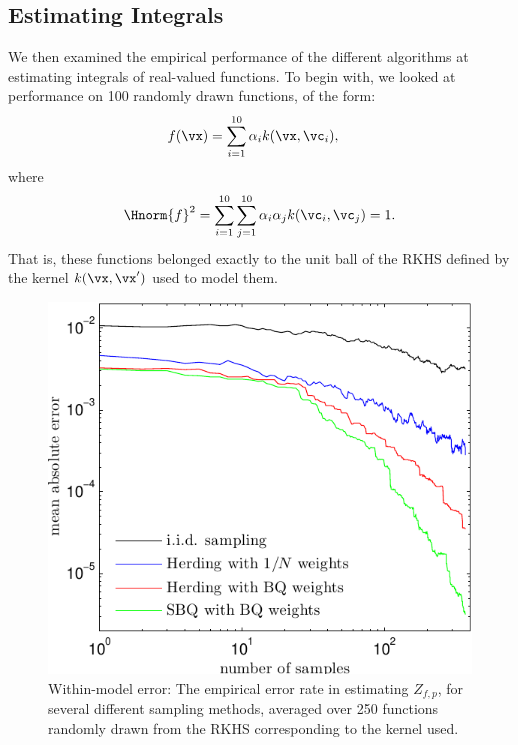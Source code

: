 \subsection{Estimating Integrals}

We then examined the empirical performance of the different algorithms at estimating integrals of real-valued functions. To begin with, we looked at performance on 100 randomly drawn functions, of the form:
%
\begin{align}
f(\vx) & = \sum_{i=1}^{10} \alpha_i k(\vx, \vc_i),
\end{align}
%
where
%
\begin{align}
\Hnorm{f}^2 = \sum_{i=1}^{10} \sum_{j=1}^{10} \alpha_i \alpha_j k(\vc_i, \vc_j) = 1.
\end{align}
%
That is, these functions belonged exactly to the unit ball of the RKHS defined by the kernel $k(\vx, \vx')$ used to model them.

\begin{figure}[t]
\centering
\includegraphics[width=.8\columnwidth]{figs/herding/error_curve_rkhs_400_v4}
\caption[Empirical error of Bayesian quadrature, herding and random sampling]{Within-model error: The empirical error rate in estimating $Z_{f,p}$, for several different sampling methods, averaged over 250 functions randomly drawn from the RKHS corresponding to the kernel used.}
\label{fig:error_curve}
\end{figure}

